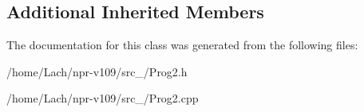 \subsection*{Additional Inherited Members}


The documentation for this class was generated from the following files\+:\begin{DoxyCompactItemize}
\item 
/home/\+Lach/npr-\/v109/src\+\_/Prog2.\+h\item 
/home/\+Lach/npr-\/v109/src\+\_/Prog2.\+cpp\end{DoxyCompactItemize}
